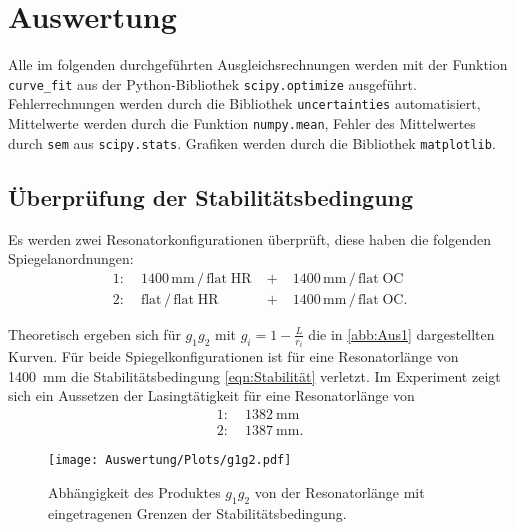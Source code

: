 \section{Auswertung}
Alle im folgenden durchgeführten Ausgleichsrechnungen werden mit der Funktion\\
\texttt{curve\_fit} aus der Python\cite{python}-Bibliothek
\texttt{scipy.optimize}\cite{scipy} ausgeführt.
Fehlerrechnungen werden durch die Bibliothek \texttt{uncertainties}\cite{uncertainties} automatisiert,
Mittelwerte werden durch die Funktion \texttt{numpy.mean}\cite{numpy}, Fehler des Mittelwertes
durch \texttt{sem} aus \texttt{scipy.stats}.
Grafiken werden durch die Bibliothek \texttt{matplotlib}\cite{matplotlib}.

\subsection{Überprüfung der Stabilitätsbedingung}
Es werden zwei Resonatorkonfigurationen überprüft, diese haben die folgenden
Spiegelanordnungen:
\begin{align*}
  1: &\; 1400\,\text{mm}\,/\,\text{flat} \; \text{HR} \; &+& \; 1400\,\text{mm}\,/\,\text{flat} \; \text{OC}\\
  2: &\; \text{flat}\,/\,\text{flat} \; \text{HR} \; &+& \; 1400\,\text{mm}\,/\,\text{flat} \; \text{OC}.
\end{align*}

Theoretisch ergeben sich für $g_1 g_2$ mit $g_i = 1 - \frac{L}{r_i}$ die in
\autoref{abb:Aus1} dargestellten Kurven.
Für beide Spiegelkonfigurationen ist für eine Resonatorlänge von \SI{1400}{\milli\metre}
die Stabilitätsbedingung \eqref{eqn:Stabilität} verletzt.
Im Experiment zeigt sich ein Aussetzen der Lasingtätigkeit für eine Resonatorlänge von
\begin{align*}
  1: &\; \SI{1382}{\milli\metre}\\
  2: &\; \SI{1387}{\milli\metre}.
\end{align*}

\begin{figure}[h]
  \centering
  \texttt{[image: Auswertung/Plots/g1g2.pdf]}
  \caption{Abhängigkeit des Produktes $g_1 g_2$ von der Resonatorlänge mit eingetragenen
  Grenzen der Stabilitätsbedingung.}
  \label{abb:Aus1}
\end{figure}

